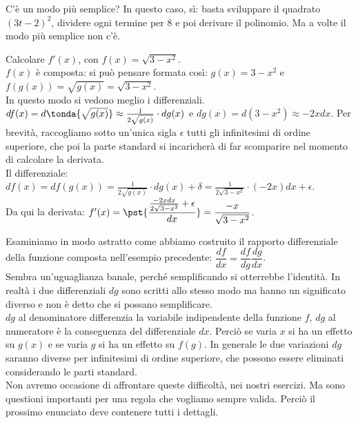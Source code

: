 C'è un modo più semplice? In questo caso, sì: basta sviluppare il quadrato
$(3t-2)^2$, dividere ogni termine per $8$ e poi derivare il polinomio. 
Ma a volte il modo più semplice non c'è.
\begin{esempio}
  Calcolare $f'(x)$, con $f(x)=\sqrt{3-x^2}$.\\
  $f(x)$ è composta: si può pensare
  formata così: $g(x)=3-x^2$ e $f(g(x))=\sqrt{g(x)}=\sqrt{3-x^2}$.\\
  In questo modo si vedono meglio i differenziali.
  $df(x)=d\tonda{\sqrt{g(x)}}\approx\frac{1}{2\sqrt{g(x)}}\cdot dg(x)$ e 
  $dg(x)=d(3-x^2)\approx-2xdx$. Per brevità, raccogliamo sotto un'unica
  sigla $\epsilon$ tutti gli infinitesimi 
  di ordine superiore, che poi la parte standard si incaricherà di far 
  scomparire nel momento di calcolare la derivata.\\
  Il differenziale: $df(x)=df(g(x))=\frac{1}{2\sqrt{g(x)}}\cdot 
dg(x)+\delta=
  \frac{1}{2\sqrt{3-x^2}}\cdot (-2x)dx+ \epsilon$.\\
  Da qui la derivata: 
  $f'(x)=\pst{\dfrac{\frac{-2xdx}{2\sqrt{3-x^2}} +\epsilon}{dx}}=
  \dfrac{-x}{\sqrt{3-x^2}}$.
\end{esempio}
Esaminiamo in modo astratto come abbiamo costruito il rapporto 
differenziale della funzione composta nell'esempio precedente: 
$\dfrac{df}{dx}=\dfrac{df}{dg}\dfrac{dg}{dx}$. \\
Sembra un'uguaglianza banale, perché semplificando si otterrebbe l'identità.
In realtà i due differenziali $dg$ sono scritti allo stesso modo ma hanno un
significato diverso e non è detto che si possano semplificare.\\
$dg$ al denominatore differenzia la variabile indipendente della funzione 
$f$, $dg$ al numeratore è la conseguenza del differenziale $dx$. Perciò
se varia $x$ si ha un effetto su $g(x)$ e se varia $g$ si ha un effetto 
su  $f(g)$. In generale le due variazioni $dg$ saranno diverse per infinitesimi
di ordine superiore, che possono essere eliminati considerando le parti 
standard.\\
Non avremo occasione di affrontare queste difficoltà, nei nostri esercizi.
Ma sono questioni importanti per una regola che vogliamo sempre valida. 
Perciò il prossimo enunciato deve contenere tutti i dettagli.

